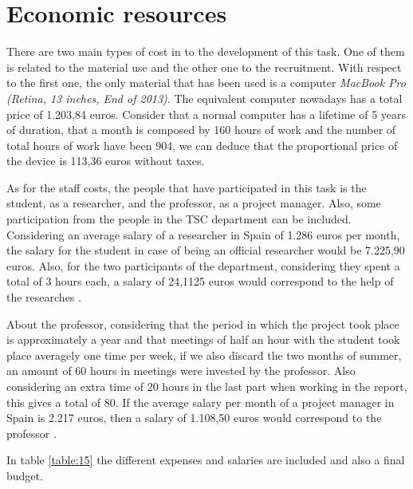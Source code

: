 \section{Economic resources}
	
	There are two main types of cost in to the development of this task. One of them is related to the material use and the other one to the recruitment. With respect to the first one, the only material that has been used is a computer \textit{MacBook Pro (Retina, 13 inches, End of 2013)}. The equivalent computer nowadays has a total price of 1.203,84 euros. Consider that a normal computer has a lifetime of 5 years of duration, that a month is composed by 160 hours of work and the number of total hours of work have been 904, we can deduce that the proportional price of the device is 113,36 euros without taxes.
	
	As for the staff costs, the people that have participated in this task is the student, as a researcher, and the professor, as a project manager. Also, some participation from the people in the TSC department can be included. Considering an average salary of a researcher in Spain of 1.286 euros per month, the salary for the student in case of being an official researcher would be 7.225,90 euros. Also, for the two participants of the department, considering they spent a total of 3 hours each, a salary of 24,1125 euros would correspond to the help of the researches \cite{Indeed2020}. 
	
	About the professor, considering that the period in which the project took place is approximately a year and that meetings of half an hour with the student took place averagely one time per week, if we also discard the two months of summer, an amount of 60 hours in meetings were invested by the professor. Also considering an extra time of 20 hours in the last part when working in the report, this gives a total of 80. If the average salary per month of a project manager in Spain is 2.217 euros, then a salary of 1.108,50 euros would correspond to the professor \cite{Indeed2020a}.
	
	In table \ref{table:15} the different expenses and salaries are included and also a final budget.
	

